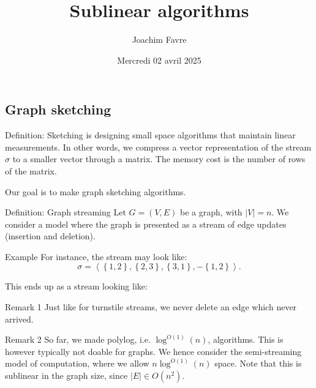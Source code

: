 \documentclass[a4paper]{article}
\title{Sublinear algorithms}
\author{Joachim Favre}
\date{Mercredi 02 avril 2025}
\begin{document}
\maketitle


\subsection{Graph sketching}

\begin{parag}{Definition: Sketching}
     is designing small space algorithms that maintain linear measurements. In other words, we compress a vector representation of the stream $\sigma$ to a smaller vector through a matrix. The memory cost is the number of rows of the matrix.

    Our goal is to make graph sketching algorithms.
\end{parag}

\begin{parag}{Definition: Graph streaming}
    Let $G = \left(V, E\right)$ be a graph, with $\left|V\right| = n$. We consider a model where the graph is presented as a stream of edge updates (insertion and deletion).

    \begin{subparag}{Example}
        For instance, the stream may look like: 
        \[\sigma = \left\langle \left\{1, 2\right\}, \left\{2, 3\right\}, \left\{3, 1\right\}, -\left\{1, 2\right\} \right\rangle.\]

        This ends up as a stream looking like:
    \end{subparag}

    \begin{subparag}{Remark 1}
        Just like for turnstile streams, we never delete an edge which never arrived.
    \end{subparag}

    \begin{subparag}{Remark 2}
        So far, we made polylog, i.e. $\log^{O\left(1\right)}\left(n\right)$, algorithms. This is however typically not doable for graphs. We hence consider the semi-streaming model of computation, where we allow $n \log^{O\left(1\right)}\left(n\right)$ space. Note that this is sublinear in the graph size, since $\left|E\right| \in O\left(n^2\right)$.
    \end{subparag}
\end{parag}
\end{document}
